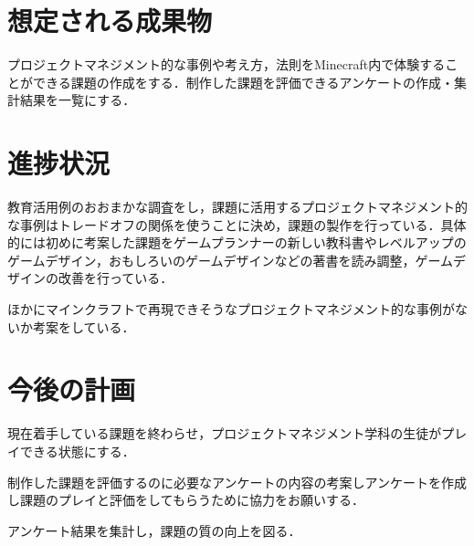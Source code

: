 \documentclass[uplatex,twocolumn,dvipdfmx]{jsarticle}
\begin{document}
\section{想定される成果物}
プロジェクトマネジメント的な事例や考え方，法則をMinecraft内で体験することができる課題の作成をする．制作した課題を評価できるアンケートの作成・集計結果を一覧にする．


\section{進捗状況}
教育活用例のおおまかな調査をし，課題に活用するプロジェクトマネジメント的な事例はトレードオフの関係を使うことに決め，課題の製作を行っている．具体的には初めに考案した課題をゲームプランナーの新しい教科書やレベルアップのゲームデザイン，おもしろいのゲームデザインなどの著書を読み調整，ゲームデザインの改善を行っている．


ほかにマインクラフトで再現できそうなプロジェクトマネジメント的な事例がないか考案をしている．



\section{今後の計画}
現在着手している課題を終わらせ，プロジェクトマネジメント学科の生徒がプレイできる状態にする．


制作した課題を評価するのに必要なアンケートの内容の考案しアンケートを作成し課題のプレイと評価をしてもらうために協力をお願いする．


アンケート結果を集計し，課題の質の向上を図る．



\end{document}
